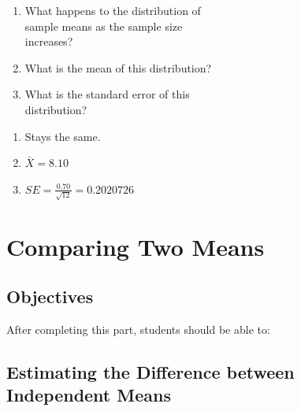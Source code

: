 \documentclass[11pt, chapterprefix=true]{scrbook}\usepackage[]{graphicx}\usepackage[]{color}
\begin{document}
\begin{exercises}
\begin{exercise}
\begin{enumerate}
  \item What happens to the distribution of \\ sample means as the sample size \\ increases?
  \item What is the mean of this distribution? 
  \item What is the standard error of this \\ distribution?
\end{enumerate}

\end{exercise}  
\begin{solution}  %

\begin{enumerate}
  \item Stays the same.
  \item $\bar{X} = 8.10$
  \item $ SE = \frac{0.70}{\sqrt{12}} = 0.2020726$ 
\end{enumerate}

\end{solution}


\end{exercises}

\onecolumn



\chapter{Comparing Two Means}
\label{chap:ch12}

\section{Objectives}

After completing this part, students should be able to:


\section{Estimating the Difference between Independent Means}  
\end{document}
